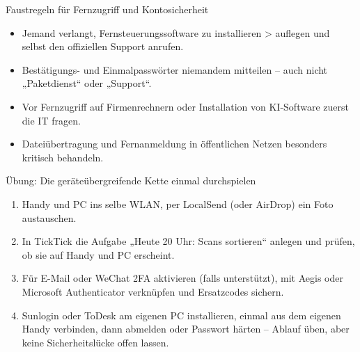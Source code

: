 \begin{tcbwarn}{Faustregeln für Fernzugriff und Kontosicherheit}
\begin{itemize}
  \item Jemand verlangt, Fernsteuerungssoftware zu installieren > auflegen und selbst den offiziellen Support anrufen.
  \item Bestätigungs- und Einmalpasswörter niemandem mitteilen – auch nicht „Paketdienst“ oder „Support“.
  \item Vor Fernzugriff auf Firmenrechnern oder Installation von KI-Software zuerst die IT fragen.
  \item Dateiübertragung und Fernanmeldung in öffentlichen Netzen besonders kritisch behandeln.
\end{itemize}

\end{tcbwarn}

\begin{tcbpractice}{Übung: Die geräteübergreifende Kette einmal durchspielen}
\begin{enumerate}
  \item Handy und PC ins selbe WLAN, per LocalSend (oder AirDrop) ein Foto austauschen.
  \item In TickTick die Aufgabe „Heute 20 Uhr: Scans sortieren“ anlegen und prüfen, ob sie auf Handy und PC erscheint.
  \item Für E-Mail oder WeChat 2FA aktivieren (falls unterstützt), mit Aegis oder Microsoft Authenticator verknüpfen und Ersatzcodes sichern.
  \item Sunlogin oder ToDesk am eigenen PC installieren, einmal aus dem eigenen Handy verbinden, dann abmelden oder Passwort härten – Ablauf üben, aber keine Sicherheitslücke offen lassen.
\end{enumerate}

\end{tcbpractice}
